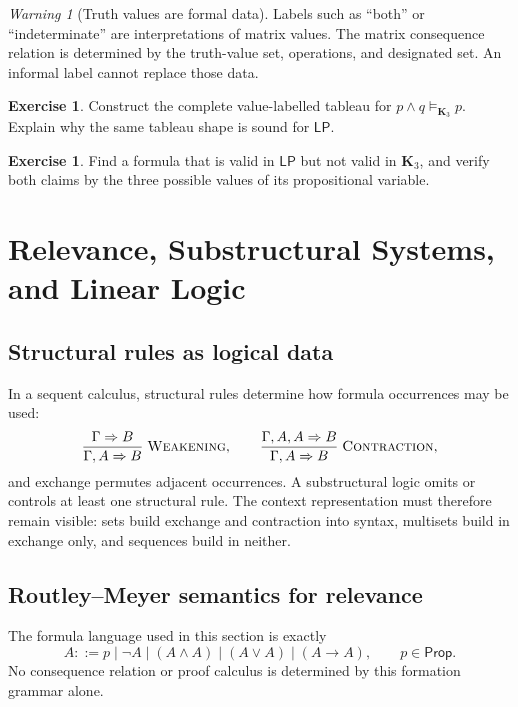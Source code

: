 \documentclass[11pt,oneside,openany]{book}
\theoremstyle{definition}
\newtheorem{exercise}[definition]{Exercise}
\theoremstyle{plain}
\theoremstyle{remark}
\newtheorem{warning}[definition]{Warning}
\newcommand{\Prop}{\mathsf{Prop}}
\newcommand{\entails}{\models}
\begin{document}
\begin{warning}[Truth values are formal data]
Labels such as ``both'' or ``indeterminate'' are interpretations of matrix
values.  The matrix consequence relation is determined by the truth-value set,
operations, and designated set.  An informal label cannot replace those data.
\end{warning}

\begin{exercise}
\label{ex:many-valued-paraconsistent-01}
Construct the complete value-labelled tableau for
\(p\land q\entails_{\mathbf K_3}p\).  Explain why the same tableau shape is
sound for \(\mathsf{LP}\).
\end{exercise}

\begin{exercise}
\label{ex:many-valued-paraconsistent-02}
Find a formula that is valid in \(\mathsf{LP}\) but not valid in
\(\mathbf K_3\), and verify both claims by the three possible values of its
propositional variable.
\end{exercise}

\chapter[Relevance and Linear Logic]{Relevance, Substructural Systems, and Linear Logic}
\label{ch:relevance-linear}

\section{Structural rules as logical data}
\label{sec:relevance-linear-01}

In a sequent calculus, structural rules determine how formula occurrences may
be used:
\[
\frac{\Gamma\Rightarrow B}{\Gamma,A\Rightarrow B}\;\textsc{Weakening},
\qquad
\frac{\Gamma,A,A\Rightarrow B}{\Gamma,A\Rightarrow B}\;\textsc{Contraction},
\]
and exchange permutes adjacent occurrences.  A substructural logic omits or
controls at least one structural rule.  The context representation must
therefore remain visible: sets build exchange and contraction into syntax,
multisets build in exchange only, and sequences build in neither.

\section{Routley--Meyer semantics for relevance}
\label{sec:relevance-linear-02}

The formula language used in this section is exactly
\[
  A::=p\mid\neg A\mid(A\land A)\mid(A\lor A)\mid(A\to A),
  \qquad p\in\Prop.
\]
No consequence relation or proof calculus is determined by this formation
grammar alone.
\end{document}
